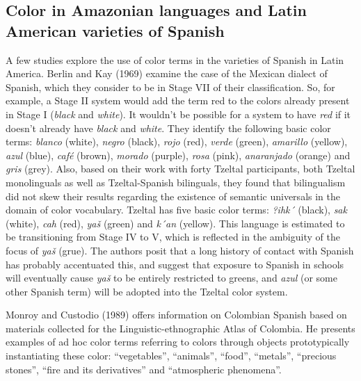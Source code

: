 \documentclass[
  english,
  ,man,floatsintext]{apa6}
\begin{document}
\hypertarget{color-in-amazonian-languages-and-latin-american-varieties-of-spanish}{%
\subsection{Color in Amazonian languages and Latin American varieties of Spanish}\label{color-in-amazonian-languages-and-latin-american-varieties-of-spanish}}

A few studies explore the use of color terms in the varieties of Spanish in Latin America. Berlin and Kay (1969) examine the case of the Mexican dialect of Spanish, which they consider to be in Stage VII of their classification. So, for example, a Stage II system would add the term red to the colors already present in Stage I (\emph{black} and \emph{white}). It wouldn't be possible for a system to have \emph{red} if it doesn't already have \emph{black} and \emph{white}. They identify the following basic color terms: \emph{blanco} (white), \emph{negro} (black), \emph{rojo} (red), \emph{verde} (green), \emph{amarillo} (yellow), \emph{azul} (blue), \emph{café} (brown), \emph{morado} (purple), \emph{rosa} (pink), \emph{anaranjado} (orange) and \emph{gris} (grey). Also, based on their work with forty Tzeltal participants, both Tzeltal monolinguals as well as Tzeltal-Spanish bilinguals, they found that bilingualism did not skew their results regarding the existence of semantic universals in the domain of color vocabulary. Tzeltal has five basic color terms: \emph{?ihk´} (black), \emph{sak} (white), \emph{cah} (red), \emph{yaš} (green) and \emph{k´an} (yellow). This language is estimated to be transitioning from Stage IV to V, which is reflected in the ambiguity of the focus of \emph{yaš} (grue). The authors posit that a long history of contact with Spanish has probably accentuated this, and suggest that exposure to Spanish in schools will eventually cause \emph{yaš} to be entirely restricted to greens, and \emph{azul} (or some other Spanish term) will be adopted into the Tzeltal color system.

Monroy and Custodio (1989) offers information on Colombian Spanish based on materials collected for the Linguistic-ethnographic Atlas of Colombia. He presents examples of ad hoc color terms referring to colors through objects prototypically instantiating these color: \enquote{vegetables}, \enquote{animals}, \enquote{food}, \enquote{metals}, \enquote{precious stones}, \enquote{fire and its derivatives} and \enquote{atmospheric phenomena}.
\end{document}
